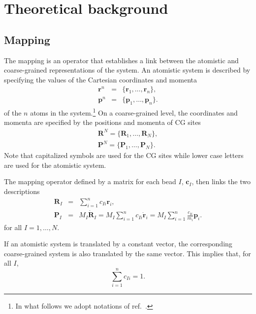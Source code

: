 \chapter{Theoretical background}

\section{Mapping}
\label{sec:mapping_operator}

The mapping is an operator that establishes a link between the atomistic and coarse-grained representations of the system. An atomistic system is described by specifying the values of the Cartesian coordinates and momenta
\begin{eqnarray}
\bm r^n &=& \{\bm r_1,\dots,\bm r_n\}, \\
\bm p^n &=& \{\bm p_1,\dots,\bm p_n\}.
\end{eqnarray}
of the $n$ atoms in the system.\footnote{In what follows we adopt notations of ref.~\cite{Noid:2008.1}.}
%
On a coarse-grained level, the coordinates and momenta are specified by the positions and momenta of CG sites
\begin{eqnarray}
\bm R^N = \{\bm R_1,\dots,\bm R_N\}, \\
\bm P^N = \{\bm P_1,\dots,\bm P_N\}.
\end{eqnarray}
Note that capitalized symbols are used for the CG sites while lower case letters are used for the atomistic system.

The mapping operator defined by a matrix for each bead $I$, ${\bm c}_I$, then links the two descriptions
\begin{eqnarray}
 {\bm R}_I &=& \sum_{i=1}^{n}c_{Ii}\bm r_i, \\
 {\bm P}_I &=&
 	M_I \dot{{\bm R}}_I =
	M_I \sum_{i=1}^{n}c_{Ii} \dot{{\bm r}}_i =
	M_I \sum_{i=1}^{n} \frac{ c_{Ii}} {m_i} {\bm p}_i .
\label{eq:mapping_scheme}
\end{eqnarray}
for all $I = 1,\dots,N$.

If an atomistic system is translated by a constant vector, the corresponding coarse-grained system is also translated by the same vector. This implies that, for all $I$,
\begin{equation}
 \sum_{i=1}^{n}c_{Ii}=1.
\end{equation}

